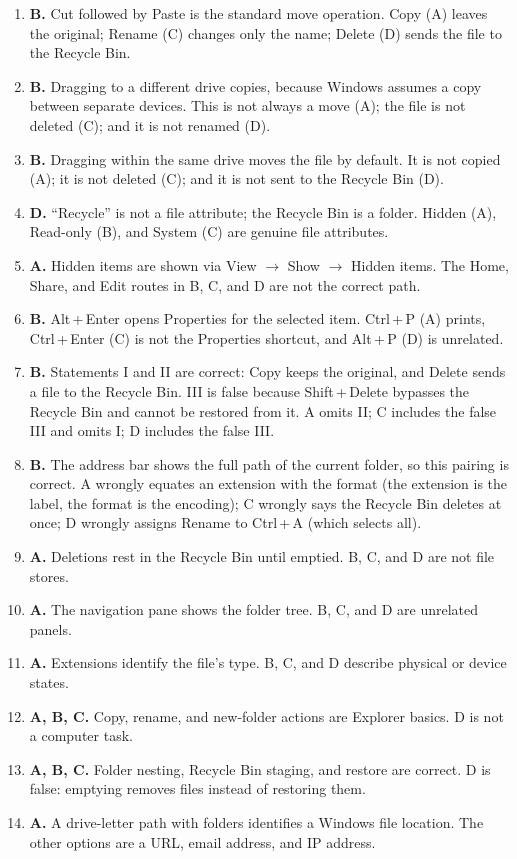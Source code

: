 \begin{enumerate}[label=\textbf{Q\arabic*.}, leftmargin=*]
  Cut (C) remove the original from its place; Rename (D) only changes the name.
\item \textbf{B.} Cut followed by Paste is the standard move operation. Copy
  (A) leaves the original; Rename (C) changes only the name; Delete (D) sends
  the file to the Recycle Bin.
\item \textbf{B.} Dragging to a different drive copies, because Windows
  assumes a copy between separate devices. This is not always a move (A); the
  file is not deleted (C); and it is not renamed (D).
\item \textbf{B.} Dragging within the same drive moves the file by default. It
  is not copied (A); it is not deleted (C); and it is not sent to the Recycle
  Bin (D).
\item \textbf{D.} ``Recycle'' is not a file attribute; the Recycle Bin is a
  folder. Hidden (A), Read-only (B), and System (C) are genuine file
  attributes.
\item \textbf{A.} Hidden items are shown via View $\rightarrow$ Show
  $\rightarrow$ Hidden items. The Home, Share, and Edit routes in B, C, and D
  are not the correct path.
\item \textbf{B.} Alt\,+\,Enter opens Properties for the selected item.
  Ctrl\,+\,P (A) prints, Ctrl\,+\,Enter (C) is not the Properties shortcut,
  and Alt\,+\,P (D) is unrelated.
\item \textbf{B.} Statements I and II are correct: Copy keeps the original,
  and Delete sends a file to the Recycle Bin. III is false because
  Shift\,+\,Delete bypasses the Recycle Bin and cannot be restored from it.
  A omits II; C includes the false III and omits I; D includes the false III.
\item \textbf{B.} The address bar shows the full path of the current folder,
  so this pairing is correct. A wrongly equates an extension with the format
  (the extension is the label, the format is the encoding); C wrongly says the
  Recycle Bin deletes at once; D wrongly assigns Rename to Ctrl\,+\,A (which
  selects all).

\item \textbf{A.} Deletions rest in the Recycle Bin until emptied. B, C, and D are not file stores.
\item \textbf{A.} The navigation pane shows the folder tree. B, C, and D are unrelated panels.
\item \textbf{A.} Extensions identify the file's type. B, C, and D describe physical or device states.
\item \textbf{A, B, C.} Copy, rename, and new-folder actions are Explorer basics. D is not a computer task.
\item \textbf{A, B, C.} Folder nesting, Recycle Bin staging, and restore are correct. D is false: emptying removes files instead of restoring them.
\item \textbf{A.} A drive-letter path with folders identifies a Windows file location. The other options are a URL, email address, and IP address.


\end{enumerate}
